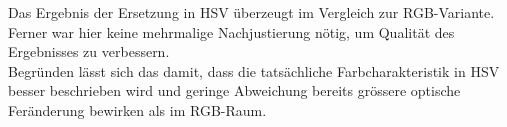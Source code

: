 Das Ergebnis der Ersetzung in HSV \"uberzeugt im Vergleich zur RGB-Variante. Ferner
war hier keine mehrmalige Nachjustierung n\"otig, um Qualit\"at des Ergebnisses zu
verbessern. \\
Begr\"unden l\"asst sich das damit, dass die tats\"achliche Farbcharakteristik in
HSV besser beschrieben wird und geringe Abweichung bereits gr\"ossere optische Fer\"anderung bewirken als im RGB-Raum.


